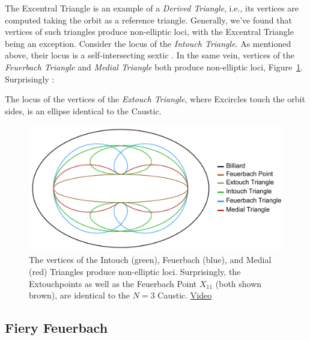 The Excentral Triangle is an example of a {\em Derived Triangle}, i.e., its vertices are computed taking the orbit as a reference triangle. Generally, we've found that vertices of such triangles produce non-elliptic loci, with the Excentral Triangle being an exception. Consider the locus of the {\em Intouch Triangle}.
As mentioned above, their locus is a self-intersecting sextic \cite[pl\#2]{dsr_math_intell_playlist}. In the same vein, vertices of the {\em Feuerbach Triangle}
and {\em Medial Triangle}
both produce non-elliptic loci, Figure~\ref{fig:non-elliptic}. Surprisingly \cite{reznik2020-loci}:

\begin{theorem}
The locus of the vertices of the {\em Extouch Triangle}, where Excircles touch the orbit sides, is an ellipse identical to the Caustic.
\label{thm:extouch}
\end{theorem}

\begin{figure}[H]
    \centering
    \includegraphics[height=.4\linewidth]{pics/u0040_non_elliptic.pdf}
    \caption{The vertices of the Intouch (green), Feuerbach (blue), and Medial (red) Triangles produce non-elliptic loci. Surprisingly, the Extouchpoints as well as the Feuerbach Point $X_{11}$ (both shown brown), are identical to the $N=3$ Caustic.
    \href{https://youtu.be/OGvCQbYqJyI}{Video} \cite[pl\#9]{dsr_math_intell_playlist}}
    \label{fig:non-elliptic}
\end{figure}

\subsection{Fiery Feuerbach}

